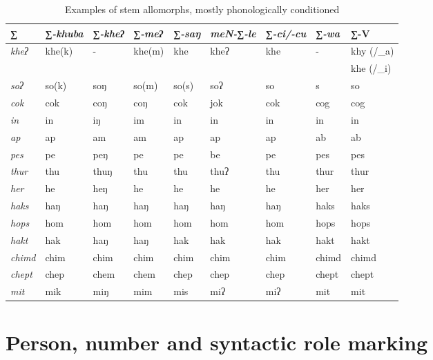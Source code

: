 	
\begin{table}[htp]
{\small
\begin{centering}
\begin{tabular}{lllllllll}
\toprule
∑&∑\emph{-khuba}&∑\emph{-kheʔ}&∑\emph{-meʔ} & ∑\emph{-saŋ} & \emph{meN-∑-le}& ∑\emph{-ci/-cu}& ∑\emph{-wa}&∑-V\\
\midrule
 \emph{kheʔ} & khe(k) &-&khe(m)&khe&kheʔ&khe&-&khy (/\_a) \\%
&&&&&&&&khe (/\_i)\\
 \emph{soʔ}& so(k) &soŋ&so(m)&so(s)&soʔ&so&s&so\\  %
 \emph{cok} & cok&coŋ&coŋ&cok&jok&cok&cog&cog\\%
 \emph{in} &in & iŋ &im&in&in&in&in&in\\%
 \emph{ap}& ap&am&am&ap&ap&ap&ab&ab\\ %
 \emph{pes} & pe&peŋ&pe&pe&be&pe&pes&pes\\%
 \emph{thur}& thu&thuŋ&thu&thu&thuʔ&thu&thur&thur\\ %
 \emph{her} & he&heŋ&he&he&he&he&her&her\\%
 \emph{haks}& haŋ&haŋ&haŋ&haŋ&haŋ&haŋ&haks&haks\\ %
 \emph{hops} & hom&hom&hom&hom&hom&hom&hops&hops\\%
 \emph{hakt} & hak&haŋ&haŋ&hak&hak&hak&hakt&hakt\\%
 \emph{chimd} & chim&chim&chim&chim&chim&chim&chimd&chimd\\%
 \emph{chept} & chep&chem&chem&chep&chep&chep&chept&chept\\%
 \emph{mit} & mik&miŋ&mim&mis&miʔ&miʔ&mit&mit\\%
 \bottomrule
\end{tabular}
\caption{Examples of stem allomorphs, mostly phonologically conditioned}\label{tab-mph-stems}
\end{centering}
}
\end{table}



\section{Person, number and syntactic role marking}\label{verb-infl}

